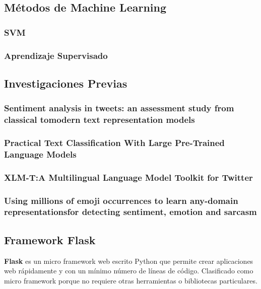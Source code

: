 \documentclass[a4paper,12pt]{article}
\theoremstyle{definition}
\theoremstyle{remark}
\begin{document}
\subsection{Métodos de Machine Learning}

\subsubsection{SVM}


\subsubsection{Aprendizaje Supervisado}



\subsection{Investigaciones Previas}
\subsubsection{Sentiment analysis in tweets: an assessment study from classical tomodern text representation models}

\subsubsection{Practical Text Classification With Large Pre-Trained Language Models}

\subsubsection{XLM-T:A Multilingual Language Model Toolkit for Twitter}

\subsubsection{Using millions of emoji occurrences to learn any-domain representationsfor detecting sentiment, emotion and sarcasm}

\subsection{Framework Flask}
\textbf{Flask} es un micro framework web escrito Python que permite crear aplicaciones web rápidamente y con un mínimo número de líneas de código. Clasificado como micro framework porque no requiere otras herramientas o bibliotecas particulares.\\
\end{document}
